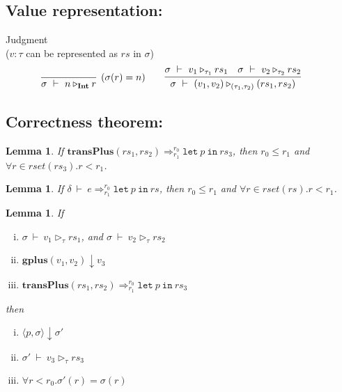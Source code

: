 \documentclass[a4paper]{article}
\newtheorem{lem}[equation]{Lemma}
\def\Int{\mathbf{Int}}
\def\Gplus#1#2{\mathbf{gplus} (#1,#2)}
\def\Eva{\downarrow}
\def\Ra{\Rightarrow}
\def\Env{\ \vdash\ }
\def\Sgm{\sigma}
\def\Jug#1{Judgment \boxed{#1} \\[1ex]}
\def\FEval#1#2{#1 \Eva #2}  %
\def\TaSem#1#2#3{\langle #1,#2 \rangle \Eva #3}
\def\Talet#1#2{\mathtt{let} \ #1 \ \mathtt{in} \ #2}
\def\Trans#1#2#3#4#5{#1 \Env #2 \Ra^{#4}_{#5} #3}
\def\TransP#1#2#3#4#5{\mathbf{transPlus} (#1,#2) \Ra^{#4}_{#5} #3}
\def\ValRep#1#2#3#4{#1 \Env #2 \triangleright_{#4} #3}
\begin{document}
\subsection{Value representation:}
\Jug{\ValRep{\Sgm}{v}{rs}{\tau}}
($v: \tau$ can be represented as $rs$ in $\Sgm$)
$$
\infer[(\Sgm(r)=n)]{\ValRep{\Sgm}{n}{r}{\Int}}{}
\qquad
\infer{\ValRep{\Sgm}{(v_1,v_2)}{(rs_1,rs_2)}{(\tau_1,\tau_2)}}
{\ValRep{\Sgm}{v_1}{rs_1}{\tau_1} & {\ValRep{\Sgm}{v_2}{rs_2}{\tau_2}}}
\qquad
$$




\subsection{Correctness theorem:}
\begin{lem}
	If $\TransP{rs_1}{rs_2}{\Talet{p}{rs_3}}{r_0}{r_1}$, then $r_0 \le r_1$ and $\forall r \in rset(rs_3). r < r_1$.
	\label{trans-fresh}
\end{lem}

\begin{lem}
	If $\Trans{\delta}{e}{\Talet{p}{rs}}{r_0}{r_1}$, then $r_0 \le r_1$ and $\forall r \in rset(rs).r < r_1$.
	\label{fresh2}
\end{lem}


\begin{lem}
   If \begin{enumerate}[(i)]
   	\item $\ValRep{\Sgm}{v_1}{rs_1}{\tau}$, and $\ValRep{\Sgm}{v_2}{rs_2}{\tau}$
   	\item $\FEval{\Gplus{v_1}{v_2}}{v_3}$
   	\item $\TransP{rs_1}{rs_2}{\Talet{p}{rs_3}} {r_0} {r_1}$
   \end{enumerate}
   then 
   \begin{enumerate}[(i)]
   	\item $\TaSem{p}{\Sgm}{\Sgm'}$ 
   	\item $\ValRep{\Sgm'}{v_3}{rs_3}{\tau}$
   	\item $\forall r < r_0. \Sgm'(r) = \Sgm(r)$ 
   \end{enumerate}
\label{plus-thm}   
\end{lem}
\end{document}

